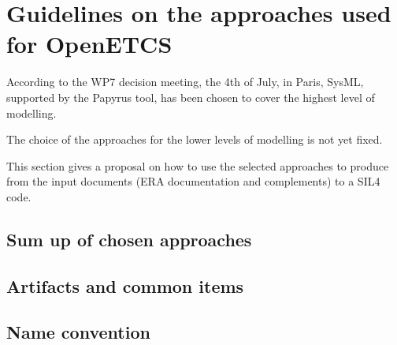 
\section{Guidelines on the approaches used for OpenETCS}


\begin{comment}
This section will be written for the final version of the document, after the approach and tools tio  use during the project will be selected.
\end{comment}

According to  the WP7 decision meeting, the 4th of July, in Paris, SysML, supported by the Papyrus tool,  has been chosen to  cover the highest level of modelling.

The choice of the approaches for the lower levels of modelling is not yet fixed.

This section gives a proposal on how to use the selected approaches to produce from the input documents (ERA documentation and complements)  to a SIL4 code.

\subsection{Sum up of chosen approaches}
\begin{comment}
list of chosen approaches, and for which activities they are used
\end{comment}


\subsection{Artifacts and common items}

\begin{comment}
list of artifacts used and provided by each approach; common items (data model); types
\end{comment}

\subsection{Name convention}


\begin{comment}
How to name object ? base : subset 26 §7.3.2:
" 7.3.2.11 All Variables have one of the following prefixes:
\begin{itemize}
\item A\_ Acceleration
\item D\_ distance
\item G\_ Gradient
\item L\_ length
\item M\_ Miscellaneous
\item N\_ Number
\item NC\_ class number
\item NID\_ identity number
\item Q\_ Qualifier
\item T\_ time/date
\item V\_ Speed
\item X\_ Text
\end{itemize}

Case sensitive language, keywords of target language (SysML, B, C, Scade 5?),...)
\end{comment}
